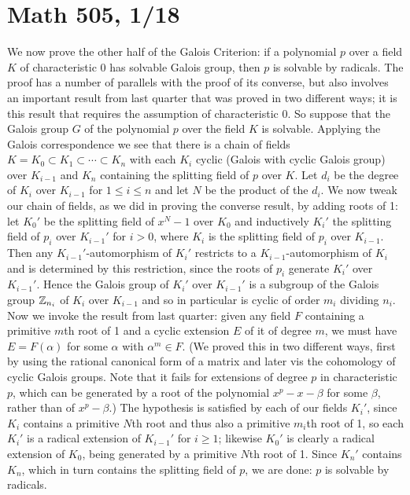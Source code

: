 \documentclass[10pt]{article}
\begin{document}
\section*{Math 505, 1/18}

We now prove the other half of the Galois Criterion: if a polynomial $p$
over a field $K$ of characteristic 0 has solvable Galois group, then $p$
is solvable by radicals. The proof has a number of parallels with the
proof of its converse, but also involves an important result from last
quarter that was proved in two different ways; it is this result that
requires the assumption of characteristic 0. So suppose that the Galois
group $G$ of the polynomial $p$ over the field $K$ is solvable. Applying
the Galois correspondence we see that there is a chain of fields $K=K_0
\subset K_1\subset\cdots\subset K_n$ with each $K_i$ cyclic (Galois with
cyclic Galois group) over $K_{i-1}$ and $K_n$ containing the splitting
field of $p$ over $K$. Let $d_i$ be the degree of $K_i$ over $K_{i-1}$
for $1\le i\le n$ and let $N$ be the product of the $d_i$. We now tweak
our chain of fields, as we did in proving the converse result, by adding
roots of 1: let $K_0'$ be the splitting field of $x^N - 1$ over $K_0$
and inductively $K_i'$ the splitting field of $p_i$ over $K_{i-1}'$ for
$i>0$, where $K_i$ is the splitting field of $p_i$ over $K_{i-1}$. Then
any $K_{i-1}'$-automorphism of $K_i'$ restricts to a
$K_{i-1}$-automorphism of $K_i$ and is determined by this restriction,
since the roots of $p_i$ generate $K_i'$ over $K_{i-1}'$. Hence the
Galois group of $K_i'$ over $K_{i-1}'$ is a subgroup of the Galois group
$\Bbb Z_{n_i}$ of $K_i$ over $K_{i-1}$ and so in particular is cyclic of
order $m_i$ dividing $n_i$. Now we invoke the result from last quarter:
given any field $F$ containing a primitive $m$th root of 1 and a cyclic
extension $E$ of it of degree $m$, we must have $E=F(\alpha)$ for some
$\alpha$ with $\alpha^m\in F$. (We proved this in two different ways,
first by using the rational canonical form of a matrix and later vis the
cohomology of cyclic Galois groups. Note that it fails for extensions of
degree $p$ in characteristic $p$, which can be generated by a root of
the polynomial $x^p - x - \beta$ for some $\beta$, rather than of $x^p -
\beta$.) The hypothesis is satisfied by each of our fields $K_i'$, since
$K_i$ contains a primitive $N$th root and thus also a primitive $m_i$th
root of 1, so each $K_i'$ is a radical extension of $K_{i-1}'$ for
$i\ge1$; likewise $K_0'$ is clearly a radical extension of $K_0$, being
generated by a primitive $N$th root of 1. Since $K_n'$ contains $K_n$,
which in turn contains the splitting field of $p$, we are done: $p$ is
solvable by radicals.
\end{document}

